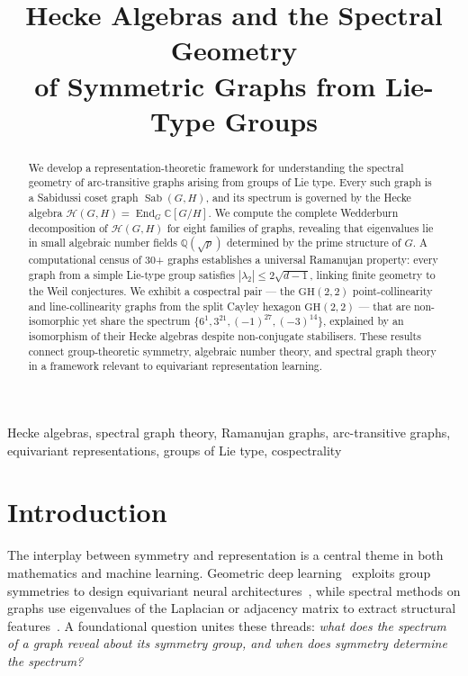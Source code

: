 \documentclass[mlmain]{jmlr}
\title[Hecke Algebras and the Spectral Geometry of Symmetric Graphs]{Hecke Algebras and the Spectral Geometry\\of Symmetric Graphs from Lie-Type Groups}
\newcommand{\Sab}{\operatorname{Sab}}
\newcommand{\GH}{\mathrm{GH}}
\newcommand{\HH}{\mathcal{H}}
\newcommand{\CC}{\mathbb{C}}
\newcommand{\Q}{\mathbb{Q}}
\begin{document}
\maketitle

\begin{abstract}
We develop a representation-theoretic framework for understanding
the spectral geometry of arc-transitive graphs arising from
groups of Lie type.
Every such graph is a Sabidussi coset graph $\Sab(G, H)$,
and its spectrum is governed by the Hecke algebra
$\HH(G,H) = \operatorname{End}_G \CC[G/H]$.
We compute the complete Wedderburn decomposition of $\HH(G,H)$
for eight families of graphs, revealing that eigenvalues lie in
small algebraic number fields $\Q(\sqrt{p})$ determined by the
prime structure of $G$.
A computational census of 30+ graphs establishes a universal
Ramanujan property: every graph from a simple Lie-type group
satisfies $|\lambda_2| \leq 2\sqrt{d-1}$, linking
finite geometry to the Weil conjectures.
We exhibit a cospectral pair --- the $\GH(2,2)$ point-collinearity and line-collinearity
graphs from the split Cayley hexagon $\GH(2,2)$ --- that
are non-isomorphic yet share the spectrum
$\{6^1, 3^{21}, (-1)^{27}, (-3)^{14}\}$,
explained by an isomorphism of their Hecke algebras
despite non-conjugate stabilisers.
These results connect group-theoretic symmetry, algebraic
number theory, and spectral graph theory in a framework
relevant to equivariant representation learning.
\end{abstract}

\begin{keywords}
Hecke algebras, spectral graph theory, Ramanujan graphs,
arc-transitive graphs, equivariant representations,
groups of Lie type, cospectrality
\end{keywords}


\section{Introduction}
\label{sec:intro}

The interplay between symmetry and representation is a
central theme in both mathematics and machine learning.
Geometric deep learning~\citep{bronstein2021} exploits
group symmetries to design equivariant neural
architectures~\citep{cohen2016, kondor2018, maron2019},
while spectral methods on graphs use eigenvalues of the
Laplacian or adjacency matrix to extract structural
features~\citep{spielman2012, kreuzer2021, lim2022}.
A foundational question unites these threads: \emph{what
does the spectrum of a graph reveal about its symmetry group,
and when does symmetry determine the spectrum?}
\end{document}
